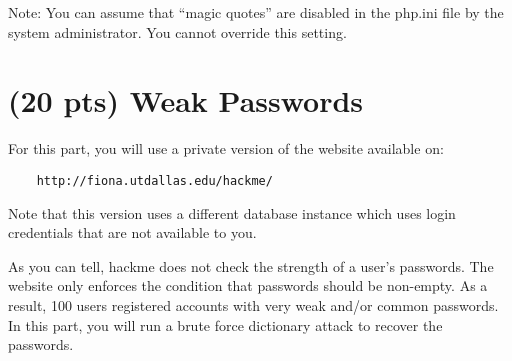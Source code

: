 \documentclass[]{article}
\begin{document}
Note: You can assume that ``magic quotes'' are disabled in the php.ini file by the system administrator. You cannot override this setting.


\section{(20 pts) Weak Passwords}
For this part, you will use a private version of the website available on:
\begin{verbatim}
	http://fiona.utdallas.edu/hackme/
\end{verbatim}
Note that this version uses a different database instance which uses login credentials that are not available to you.

As you can tell, hackme does not check the strength of a user's passwords. The website only enforces the condition that passwords should be non-empty. As a result, 100 users registered accounts with very weak and/or common passwords. In this part, you will run a brute force dictionary attack to recover the passwords.
\end{document}
